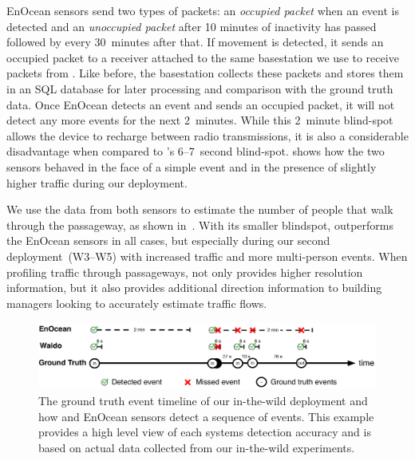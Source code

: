 EnOcean sensors send two types of packets: an \emph{occupied packet} when an event is detected and an \emph{unoccupied packet} after 10 minutes of inactivity has passed followed by every 30~minutes after that.  
If movement is detected, it sends an occupied packet to a receiver attached to the same basestation we use to receive packets from \sysname.
Like before, the basestation collects these packets and stores them in an SQL database for later processing and comparison with the ground truth data.
Once EnOcean detects an event and sends an occupied packet, it will not detect any more events for the next 2~minutes. 
While this 2~minute blind-spot allows the device to recharge between radio transmissions, it is also a considerable disadvantage when compared to \sysname's 6--7~second blind-spot.
 shows how the two sensors behaved in the face of a simple event and in the presence of slightly higher traffic during our deployment.


We use the data from both sensors to estimate the number of people that walk through the passageway, as shown in~.
With its smaller blindspot, \sysname outperforms the EnOcean sensors in all cases, but especially during our second deployment~(W3--W5) with increased traffic and more multi-person events.
When profiling traffic through passageways, \sysname not only provides higher resolution information, but it also provides additional direction information to building managers looking to accurately estimate traffic flows.

\begin{figure}[t]
\centering
\includegraphics[width=1.0\columnwidth]{figs/enocean_v_waldo_v_gt.pdf}
\caption{ The ground truth event timeline of our in-the-wild deployment and how \sysname and EnOcean sensors detect a sequence of events.  This example provides a high level view of each systems detection accuracy and is based on actual data collected from our in-the-wild experiments.  \label{fig:enoceanVwaldo}}
\end{figure}

